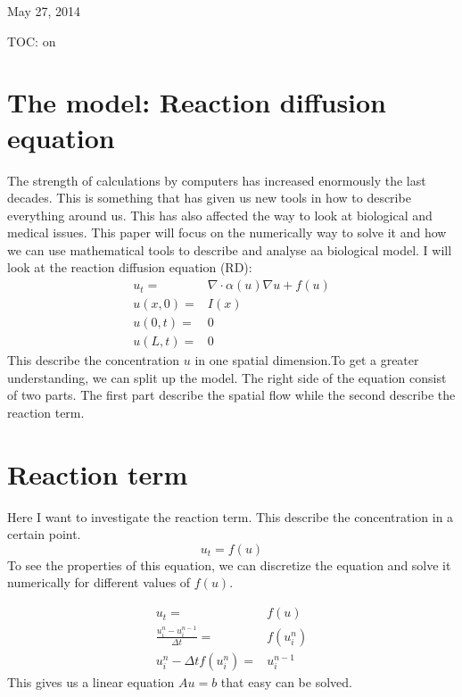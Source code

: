 \documentclass{book}
\begin{document}

\begin{center}
May 27, 2014
\end{center}


TOC: on


\section{The model: Reaction diffusion equation}

The strength of calculations by computers has increased enormously the last
decades. This is something that has given us new
tools in how to describe everything around us. This has also affected the way to
look at biological and medical issues. This
paper will focus on the numerically way to solve it and how we can use
mathematical tools to describe and analyse aa biological model. I will look at 
the reaction diffusion equation (RD):
\begin{align} \label{eq:reaction_diffusion}
u_t =& \nabla \cdot \alpha(u)\nabla u + f(u)\\
u(x,0) =& I(x)\\
u(0,t)=& 0\\
u(L,t)=& 0
\end{align}
This describe the concentration $u$ in
one spatial dimension.To get a greater understanding, we can split up the model. The right side of the equation consist of two parts. The
first part describe the spatial flow while the second describe the reaction
term.


\section{Reaction term}

Here I want to investigate the reaction term. This describe the concentration in
a certain point.
\begin{equation}
u_t = f(u)
\end{equation}
To see the properties of this equation, we can  discretize the equation and solve it numerically for
different values of $f(u)$.

\begin{align*}
u_t =& f(u)\\
\frac{u^n_i-u^{n-1}_i}{\Delta t}=& f(u^n_i)\\
u^n_i-\Delta t f(u^n_i) =& u^{n-1}_i
\end{align*}
This gives us a linear equation $Au = b$ that easy can be solved.
\end{document}
